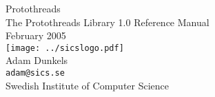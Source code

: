 \documentclass[a4paper]{article}
\begin{document}
\begin{titlepage}
\vspace*{5cm}
\begin{center}
{\Huge Protothreads}\\
\vspace*{1cm}
{\LARGE The Protothreads Library 1.0 Reference Manual}\\
\vspace*{3cm}
{\Large February 2005}\\
\vspace*{2cm}
\texttt{[image: ../sicslogo.pdf]}\\
\vspace*{1cm}
{\Large Adam Dunkels}\\
{\Large \texttt{adam@sics.se}}\\
\vspace*{1cm}
{\LARGE Swedish Institute of Computer Science}\\
\vspace*{0.5cm}

\end{center}
\end{titlepage}
\tableofcontents
{}
\end{document}
